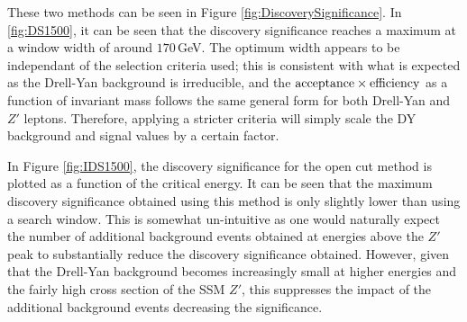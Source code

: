 \documentclass{article}
\begin{document}
These two methods can be seen in Figure \ref{fig:DiscoverySignificance}. In \ref{fig:DS1500}, it can be seen that the discovery significance reaches a maximum at a window width of around $170\,$GeV. The optimum width appears to be independant of the selection criteria used; this is consistent with what is expected as the Drell-Yan background is irreducible, and the $\rm{acceptance}\times\rm{efficiency}$ as a function of invariant mass follows the same general form for both Drell-Yan and $Z'$ leptons. Therefore, applying a stricter criteria will simply scale the DY background  and signal values by a certain factor. 


In Figure \ref{fig:IDS1500}, the discovery significance for the open cut method is plotted as a function of the critical energy. It can be seen that the maximum discovery significance obtained using this method is only slightly lower than using a search window. This is somewhat un-intuitive as one would naturally expect the number of additional background events obtained at energies above the $Z'$ peak to substantially reduce the discovery significance obtained. However, given that the Drell-Yan background becomes increasingly small at higher energies and the fairly high cross section of the SSM $Z'$, this suppresses the impact of the additional background events decreasing the significance.
\end{document}
